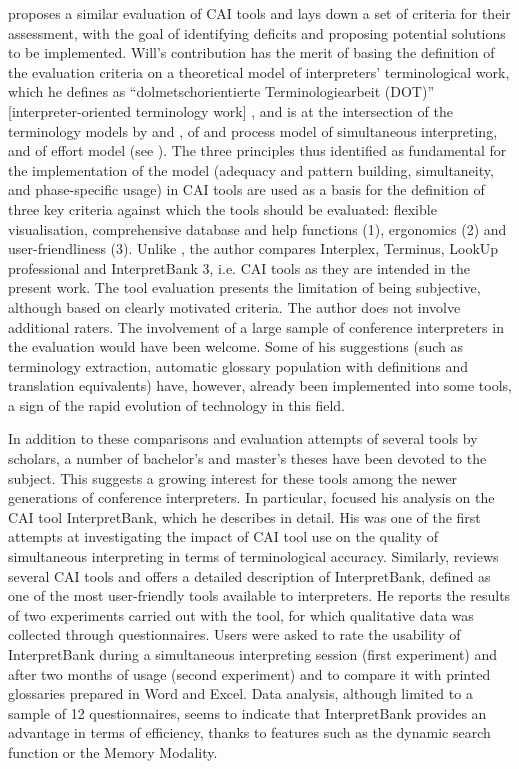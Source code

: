 \citet{will_zur_2015} proposes a similar evaluation of CAI tools and lays down a set of criteria for their assessment, with the goal of identifying deficits and proposing potential solutions to be implemented. Will's contribution has the merit of basing the definition of the evaluation criteria on a theoretical model of interpreters' terminological work, which he defines as ``dolmetschorientierte Terminologiearbeit (DOT)'' [interpreter-oriented terminology work] \citep[181]{will_zur_2015}, and is at the intersection of the terminology models by \citet{wuster_einfuhrung_1979} and \citet{gerzymisch-arbogast_termini_1996}, of \citet{moser_simultaneous_1978} and  process model of simultaneous interpreting, and of  effort model (see ). The three principles thus identified as fundamental for the implementation of the model (adequacy and pattern building, simultaneity, and phase-specific usage) in CAI tools are used as a basis for the definition of three key criteria against which the tools should be evaluated: flexible visualisation, comprehensive database and help functions (1), ergonomics (2) and user-friendliness (3). Unlike \citet{costa_technology-assisted_2014,costa_comparative_2014,costa_interpreters_2015}, the author compares Interplex, Terminus, LookUp professional and InterpretBank 3, i.e. CAI tools as they are intended in the present work. The tool evaluation presents the limitation of being subjective, although based on clearly motivated criteria. The author does not involve additional raters. The involvement of a large sample of conference interpreters in the evaluation would have been welcome. Some of his suggestions (such as terminology extraction, automatic glossary population with definitions and translation equivalents) have, however, already been implemented into some tools, a sign of the rapid evolution of technology in this field.

In addition to these comparisons and evaluation attempts of several tools by scholars, a number of bachelor's and master's theses have been devoted to the subject. This suggests a growing interest for these tools among the newer generations of conference interpreters. In particular, \citet{de_merulis_luso_2013} focused his analysis on the CAI tool InterpretBank, which he describes in detail. His was one of the first attempts at investigating the impact of CAI tool use on the quality of simultaneous interpreting in terms of terminological accuracy. Similarly, \citet{gacek_softwarelosungen_2015} reviews several CAI tools and offers a detailed description of InterpretBank, defined as one of the most user-friendly tools available to interpreters. He reports the results of two experiments carried out with the tool, for which qualitative data was collected through questionnaires. Users were asked to rate the usability of InterpretBank during a simultaneous interpreting session (first experiment) and after two months of usage (second experiment) and to compare it with printed glossaries prepared in Word and Excel. Data analysis, although limited to a sample of 12 questionnaires, seems to indicate that InterpretBank provides an advantage in terms of efficiency, thanks to features such as the dynamic search function or the Memory Modality.

